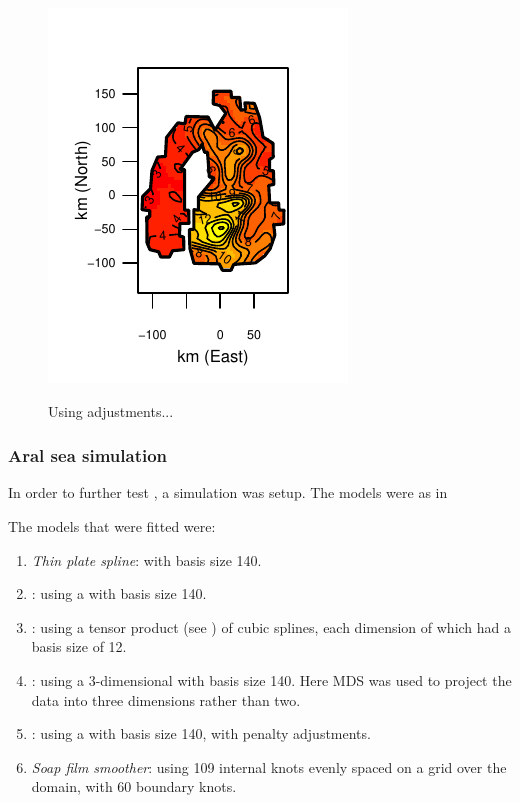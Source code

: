 \begin{figure}
\centering
\includegraphics{mds/figs/aral-adjfit.pdf} \\
\caption{Using adjustments...}
\label{aral-fit}
\end{figure}


\subsubsection{Aral sea simulation}

In order to further test \mdsap, a simulation was setup. The models were as in 

The models that were fitted were:
\begin{enumerate}
\item \emph{Thin plate spline}:  with basis size 140.
\item \emph{\mdsap}: using a \tprs with basis size 140.
\item \emph{\mdsap}: using a tensor product (see ) of cubic splines, each dimension of which had a basis size of 12.
\item \emph{\mdsap}: using a 3-dimensional \tprs with basis size 140. Here MDS was used to project the data into three dimensions rather than two.
\item \emph{\mdsap}: using a \tprs with basis size 140, with penalty adjustments.
\item \emph{Soap film smoother}: using 109 internal knots evenly spaced on a grid over the domain, with 60 boundary knots.
\end{enumerate}



